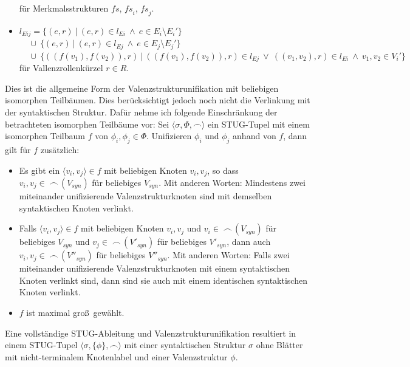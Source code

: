 \begin{definition}[Valenzstrukturunifikation]
\begin{itemize}
                 für Merkmalsstrukturen $\mathit{fs}$, $\mathit{fs}_i$, $\mathit{fs}_j$.
  \item $l_{Eij} = \{ (e,r) \ | \ (e,r) \in l_{Ei} \ \wedge \ e \in E_i \setminus E_i' \} $ \\
                 $~~~~~ \cup \ \{ (e,r) \ | \ (e,r) \in l_{Ej} \ \wedge \ e \in E_j \setminus E_j' \} $ \\
                 $~~~~~ \cup \ \{ ((f(v_1),f(v_2)),r) \ | \  ((f(v_1),f(v_2)),r) \in l_{Ej} \ \vee \ ((v_1,v_2),r) \in l_{Ei} \ \wedge \  v_1,v_2 \in V_i'\} $ \\
                 für Vallenzrollenkürzel $r \in R$.                
\end{itemize}
\end{definition}
Dies ist die allgemeine Form der Valenzstrukturunifikation mit beliebigen isomorphen Teilbäumen. Dies berücksichtigt jedoch noch nicht die Verlinkung mit der syntaktischen Struktur. Dafür nehme ich folgende Einschränkung der betrachteten isomorphen Teilbäume vor: Sei $\langle \sigma, \Phi, \frown \rangle$ ein STUG-Tupel mit einem isomorphen Teilbaum $f$ von $\phi_i, \phi_j \in \Phi$. Unifizieren $\phi_i$ und $\phi_j$ anhand von $f$, dann gilt für $f$ zusätzlich:
\begin{itemize}
  \item Es gibt ein $\langle v_i,v_j \rangle \in f$ mit beliebigen Knoten $v_i,v_j$, so dass $v_i,v_j \in \; \frown\,(V_{\mathit{syn}})$ für beliebiges $V_{\mathit{syn}}$. Mit anderen Worten: Mindestens zwei miteinander unifizierende Valenzstrukturknoten sind mit demselben syntaktischen Knoten verlinkt.
  \item Falls $\langle v_i,v_j \rangle \in f$ mit beliebigen Knoten $v_i,v_j$ und $v_i \in \; \frown\,(V_{\mathit{syn}})$ für beliebiges $V_{\mathit{syn}}$ und $v_j \in \; \frown\,(V'_{\mathit{syn}})$ für beliebiges $V'_{\mathit{syn}}$, dann auch $v_i,v_j \in \; \frown\,(V''_{\mathit{syn}})$ für beliebiges $V''_{\mathit{syn}}$. Mit anderen Worten: Falls zwei miteinander unifizierende Valenzstrukturknoten mit einem syntaktischen Knoten verlinkt sind, dann sind sie auch mit einem identischen syntaktischen Knoten verlinkt.
  \item $f$ ist maximal gro\ss\ gewählt.
\end{itemize}

Eine vollständige STUG-Ableitung und Valenzstrukturunifikation resultiert in einem STUG-Tupel $\langle \sigma, \{\phi\}, \frown \rangle$ mit einer syntaktischen Struktur $\sigma$ ohne Blätter mit nicht-termina\-lem Knotenlabel und einer Valenzstruktur $\phi$.


